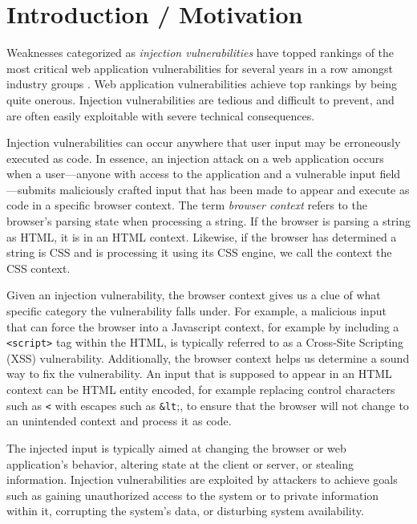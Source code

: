 
\section{Introduction / Motivation}


Weaknesses categorized as \emph{injection vulnerabilities} have topped
rankings of the most critical web application vulnerabilities for
several years in a row amongst industry groups \cite{owasp, cwsans}.
Web application vulnerabilities achieve top rankings by being quite
onerous. Injection vulnerabilities are tedious and
difficult to prevent, and are often easily exploitable with
severe technical consequences.

Injection vulnerabilities can occur anywhere that user input may be erroneously
executed as code. In essence, an injection attack on a web application
occurs when a user---anyone with access to the application and a
vulnerable input field---submits maliciously crafted input that has
been made to appear and execute as code in a specific browser context.
The term \emph{browser context} refers to the browser's parsing state
when processing a string. If the browser is parsing a string as HTML,
it is in an HTML context. Likewise, if the browser has determined
a string is CSS and is processing it using its CSS engine, we call
the context the CSS context.

Given an injection vulnerability, the browser context gives us a clue
of what specific category the vulnerability falls under.
For example, a malicious input that can force the browser into a Javascript
context, for example by including a \texttt{<script>} tag within the HTML,
is typically referred to as a Cross-Site Scripting (XSS) vulnerability.
Additionally, the browser context helps us determine a sound way to
fix the vulnerability. An input that is supposed to appear in an HTML
context can be HTML entity encoded, for example replacing control characters such
as \texttt{<} with escapes such as \texttt{\&lt};, to ensure that the browser will
not change to an unintended context and process it as code. 

The injected input is typically aimed at changing the browser or web application's
behavior, altering state at the client or server, or stealing information.
Injection vulnerabilities are exploited by attackers to achieve goals such as
gaining unauthorized access to the system or to private information
within it, corrupting the system's data, or disturbing system availability.


